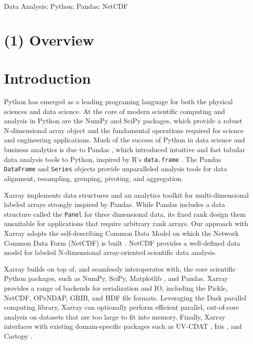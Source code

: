 \documentclass{jors}
\begin{document}
{Data Analysis; Python; Pandas; NetCDF}

\section*{(1) Overview}

\section*{Introduction}

Python has emerged as a leading programing language for both the physical sciences and data science.
At the core of modern scientific computing and analysis in Python are the NumPy \citep{Jones_2001} and SciPy \citep{van_der_Walt_2011} packages, which provide a robust N-dimensional array object and the fundamental operations required for science and engineering applications.
Much of the success of Python in data science and business analytics is
due to Pandas \citep{mckinney_2010}, which introduced intuitive and fast tabular data analysis tools to Python, inspired by R's \verb|data.frame| \citep{r_2013}.
The Pandas \verb|DataFrame| and \verb|Series| objects provide unparalleled analysis tools for data alignment, resampling, grouping, pivoting, and aggregation.

Xarray implements data structures and an analytics toolkit for multi-dimensional
labeled arrays strongly inspired by Pandas.
While Pandas includes a data structure called the \verb|Panel| for three dimensional data, its fixed rank design them unsuitable for applications that require arbitrary rank arrays.
Our approach with Xarray adopts the self-describing Common Data Model on which the Network Common Data Form (NetCDF) is built \citep{Rew_1990,Brown_1993}.
NetCDF provides a well-defined data model for labeled N-dimensional array-oriented scientific data analysis.

Xarray builds on top of, and seamlessly interoperates with, the core scientific Python packages, such as NumPy, SciPy, Matplotlib \citep{Hunter_2007}, and Pandas.
Xarray provides a range of backends for serialization and IO, including the Pickle, NetCDF, OPeNDAP, GRIB, and HDF file formats.
Leveraging the Dask parallel computing library, Xarray can optionally perform efficient parallel, out-of-core analysis on datasets that are too large to fit into memory.
Finally, Xarray interfaces with existing domain-specific packages such as UV-CDAT \citep{uvcdat}, Iris \citep{Iris}, and Cartopy \citep{Cartopy}.
\end{document}
